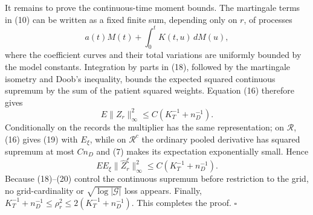 It remains to prove the continuous-time moment bounds.  The martingale
terms in (10) can be written as a fixed finite sum, depending only on
\(r\), of processes
\[
 a(t)M(t)+\int_0^tK(t,u)\,dM(u),                           \tag{18}
\]
where the coefficient curves and their total variations are uniformly
bounded by the model constants.  Integration by parts in (18), followed by
the martingale isometry and Doob's inequality, bounds the expected squared
continuous supremum by the sum of the patient squared weights.  Equation
(16) therefore gives
\[
 E\|Z_r\|_\infty^2\le C(K_T^{-1}+n_D^{-1}).                \tag{19}
\]
Conditionally on the records the multiplier has the same representation;
on \(\mathcal R\), (16) gives (19) with \(E_\xi\), while on
\(\mathcal R^c\) the ordinary pooled derivative has squared supremum at
most \(Cn_D\) and (7) makes its expectation exponentially small.  Hence
\[
 E E_\xi\|\widehat Z_r^\xi\|_\infty^2
 \le C(K_T^{-1}+n_D^{-1}).                                \tag{20}
\]
Because (18)--(20) control the continuous supremum before restriction to
the grid, no grid-cardinality or \(\sqrt{\log|\mathcal G|}\) loss appears.
Finally, \(K_T^{-1}+n_D^{-1}\le\rho_r^2\le
2(K_T^{-1}+n_D^{-1})\).  This completes the proof. \(\square\)